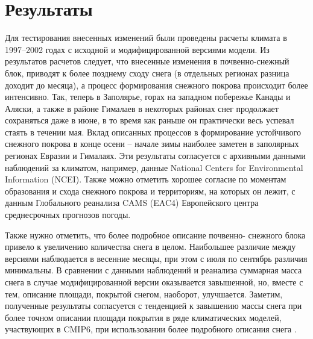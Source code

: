 \documentclass[a4paper, fontsize=12pt]{scrartcl}
\begin{document}
\section{Результаты}
Для тестирования внесенных изменений были проведены расчеты климата в 1997--2002 годах с исходной и модифицированной версиями модели. Из результатов расчетов следует, что внесенные изменения в почвенно-снежный блок, приводят к более позднему сходу снега (в отдельных регионах разница доходит до месяца), а процесс формирования снежного покрова происходит более интенсивно. Так, теперь в Заполярье, горах на западном побережье Канады и Аляски, а также в районе Гималаев в некоторых районах снег продолжает сохраняться даже в июне, в то время как раньше он практически весь успевал стаять в течении мая. Вклад описанных процессов в формирование устойчивого снежного покрова в конце осени -- начале зимы наиболее заметен в заполярных регионах Евразии и Гималаях. Эти результаты согласуется с архивными данными наблюдений за климатом, например, данные National Centers for Environmental Information (NCEI). Также можно отметить хорошее согласие по моментам образования и схода снежного покрова и территориям, на которых он лежит, с данным Глобального реанализа CAMS (EAC4) Европейского центра среднесрочных прогнозов погоды. 

Также нужно отметить, что более подробное описание почвенно- снежного блока привело к увеличению количества снега в целом. Наибольшее различие между версиями наблюдается в весенние месяцы, при этом с июля по сентябрь различия минимальны. В сравнении с данными наблюдений и реанализа суммарная масса снега в случае модифицированной версии оказывается завышенной, но, вместе с тем, описание площади, покрытой снегом, наоборот, улучшается. Заметим, полученные результаты согласуется с тенденцией к завышению массы снега при более точном описании площади покрытия в ряде климатических моделей, участвующих в CMIP6, при использовании более подробного описания снега \cite{Mudryk}.
\end{document}
